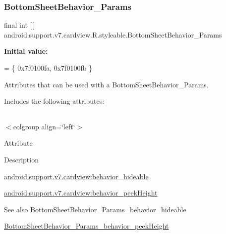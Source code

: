 \subsubsection{\texorpdfstring{Bottom\+Sheet\+Behavior\+\_\+\+Params}{BottomSheetBehavior\_Params}}
{\footnotesize\ttfamily final int \mbox{[}$\,$\mbox{]} android.\+support.\+v7.\+cardview.\+R.\+styleable.\+Bottom\+Sheet\+Behavior\+\_\+\+Params\hspace{0.3cm}{\ttfamily [static]}}

{\bfseries Initial value\+:}
\begin{DoxyCode}
= \{
            0x7f0100fa, 0x7f0100fb
        \}
\end{DoxyCode}
Attributes that can be used with a Bottom\+Sheet\+Behavior\+\_\+\+Params. 

Includes the following attributes\+:

\tabulinesep=1mm
\begin{longtabu} spread 0pt [c]{*{0}{|X[-1]}|}
\hline
\end{longtabu}
$<$colgroup align=\char`\"{}left\char`\"{}$>$ 

Attribute

Description 

{\ttfamily \hyperlink{classandroid_1_1support_1_1v7_1_1cardview_1_1R_1_1styleable_a3fb8831fef78b8f4d978262776c7b3f8}{android.\+support.\+v7.\+cardview\+:behavior\+\_\+hideable}}

{\ttfamily \hyperlink{classandroid_1_1support_1_1v7_1_1cardview_1_1R_1_1styleable_a837e9a3aff36cd40661b35572539903d}{android.\+support.\+v7.\+cardview\+:behavior\+\_\+peek\+Height}}

\begin{DoxySeeAlso}{See also}
\hyperlink{classandroid_1_1support_1_1v7_1_1cardview_1_1R_1_1styleable_a3fb8831fef78b8f4d978262776c7b3f8}{Bottom\+Sheet\+Behavior\+\_\+\+Params\+\_\+behavior\+\_\+hideable} 

\hyperlink{classandroid_1_1support_1_1v7_1_1cardview_1_1R_1_1styleable_a837e9a3aff36cd40661b35572539903d}{Bottom\+Sheet\+Behavior\+\_\+\+Params\+\_\+behavior\+\_\+peek\+Height} 
\end{DoxySeeAlso}
\mbox{\label{classandroid_1_1support_1_1v7_1_1cardview_1_1R_1_1styleable_a3fb8831fef78b8f4d978262776c7b3f8}} 
